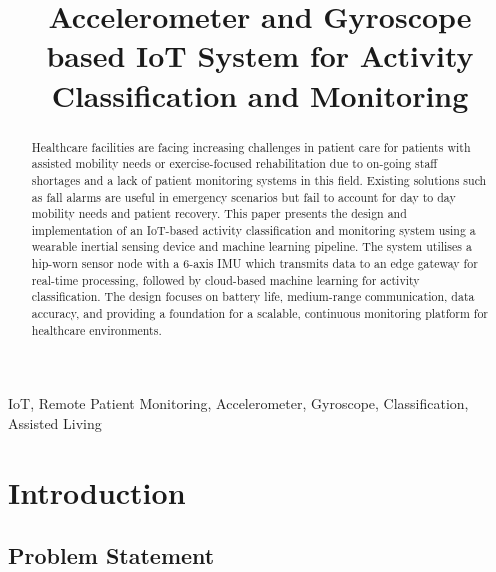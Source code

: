 \documentclass[conference]{IEEEtran}
\begin{document}
\title{Accelerometer and Gyroscope based IoT System for Activity Classification and Monitoring\\
}

\author{
\and
{}
}

\maketitle

\begin{abstract}
Healthcare facilities are facing increasing challenges in patient care for patients with assisted mobility needs or exercise-focused rehabilitation due to on-going staff shortages and a lack of patient monitoring systems in this field. Existing solutions such as fall alarms are useful in emergency scenarios but fail to account for day to day mobility needs and patient recovery. This paper presents the design and implementation of an IoT-based activity classification and monitoring system using a wearable inertial sensing device and machine learning pipeline. The system utilises a hip-worn sensor node with a 6-axis IMU which transmits data to an edge gateway for real-time processing, followed by cloud-based machine learning for activity classification. The design focuses on battery life, medium-range communication, data accuracy, and providing a foundation for a scalable, continuous monitoring platform for healthcare environments.
\end{abstract}

\begin{IEEEkeywords}
IoT, Remote Patient Monitoring, Accelerometer, Gyroscope, Classification, Assisted Living
\end{IEEEkeywords}

\section{Introduction}


\subsection{Problem Statement}
\end{document}
